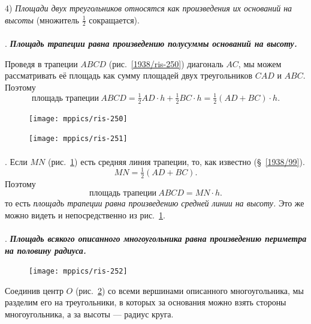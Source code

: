 \documentclass[oneside]{book}
\begin{document}
4) \emph{Площади двух треугольников относятся как произведения их оснований на высоты} (множитель $\tfrac12$ сокращается).


\paragraph{}\label{1938/250}
.
\textbf{\emph{Площадь трапеции равна произведению полусуммы оснований на высоту.}}

Проведя в трапеции $ABCD$ (рис.~\ref{1938/ris-250}) диагональ $AC$, мы можем рассматривать её площадь как сумму площадей двух треугольников $CAD$ и $ABC$.
Поэтому
\[\text{площадь трапеции}~ABCD
=\tfrac12AD\cdot  h+\tfrac12BC\cdot  h= 
\tfrac12(AD+BC) \cdot  h.\]

\begin{figure}[h]
\begin{minipage}{.48\textwidth}
\centering
\texttt{[image: mppics/ris-250]}
\caption{}\label{1938/ris-250}
\end{minipage}
\hfill
\begin{minipage}{.48\textwidth}
\centering
\texttt{[image: mppics/ris-251]}
\caption{}\label{1938/ris-251}
\end{minipage}
\end{figure}

\paragraph{}\label{1938/251}
.
Если $MN$ (рис.~\ref{1938/ris-251}) есть средняя линия трапеции, то, как известно (§~\ref{1938/99}).
\[MN = \tfrac12(AD+BC).\]
Поэтому
\[\text{площадь трапеции}~ABCD=MN\cdot  h.\]
то есть \emph{площадь трапеции равна произведению средней линии на высоту.}
Это же можно видеть и непосредственно из рис.~\ref{1938/ris-251}.

\paragraph{}\label{1938/252}
.
\textbf{\emph{Площадь всякого описанного многоугольника равна произведению периметра на половину радиуса.}}

\begin{figure}
\centering
\texttt{[image: mppics/ris-252]}
\caption{}\label{1938/ris-252}
\end{figure}

Соединив центр $O$ (рис.~\ref{1938/ris-252}) со всеми вершинами описанного многоугольника, мы разделим его на треугольники, в которых за основания можно взять стороны многоугольника, а за высоты — радиус круга.
\end{document}
